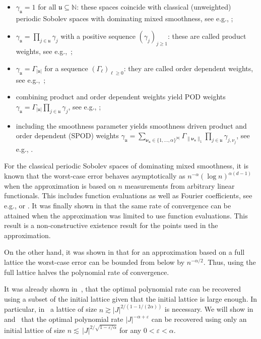 \documentclass[a4paper]{amsart}
\begin{document}
\begin{itemize}
\item
    $\gamma_{\mathfrak u} = 1$ for all $\mathfrak u\subseteq\mathds N$: these spaces coincide with classical (unweighted) periodic Sobolev spaces with dominating mixed smoothness, see e.g., \cite{DTU18};
\item
    $\gamma_{\mathfrak u} = \prod_{j\in\mathfrak u}\gamma_j$ with a positive sequence $(\gamma_j)_{j\ge 1}$: these are called product weights, see e.g.,~\cite{Sloan1998, Woniakowski2009};
\item
    $\gamma_{\mathfrak u} = \Gamma_{|\mathfrak u|}$ for a sequence $(\Gamma_\ell)_{\ell\ge 0}$: they are called order dependent weights, see e.g.,~\cite{Dick2006};
\item
    combining product and order dependent weights yield POD weights $\gamma_{\mathfrak u} = \Gamma_{|\mathfrak u|}\prod_{j\in\mathfrak u}\gamma_j$, see e.g., \cite{Kuo2012, Graham2014, Kuo2016, Graham2018};
\item
    including the smoothness parameter yields smoothness driven product and order dependent (SPOD) weights  $\gamma_{\mathfrak u} = \sum_{\bm\nu_{\mathfrak u}\in\{1, \dots, \alpha\}^{|\mathfrak u|}} \Gamma_{\|\bm\nu_{\mathfrak u}\|_1}\prod_{j\in\mathfrak u}\gamma_{j,\nu_j}$, see e.g., \cite{DKLNS14,Dick2016,Kaarnioja2020}.
\end{itemize}

For the classical periodic Sobolev spaces of dominating mixed smoothness, it is known that the worst-case error behaves asymptotically as $n^{-\alpha}(\log n)^{\alpha(d-1)}$ when the approximation is based on $n$ measurements from arbitrary linear functionals.
This includes function evaluations as well as Fourier coefficients, see e.g., \cite{M62} or \cite[Section~4.1]{DTU18}.
It was finally shown in \cite{DKU23} that the same rate of convergence can be attained when the approximation was limited to use function evaluations.
This result is a non-constructive existence result for the points used in the approximation.

On the other hand, it was shown in \cite[Proposition~3.3]{BKUV17} that for an approximation based on a full lattice the worst-case error can be bounded from below by $n^{-\alpha/2}$.
Thus, using the full lattice halves the polynomial rate of convergence.

It was already shown in~\cite{BKPU22}, that the optimal polynomial rate can be recovered using a subset of the initial lattice given that the initial lattice is large enough.
In particular, in~\cite{BKPU22} a lattice of size $n \gtrsim |J|^{2/(1-1/(2\alpha))}$ is necessary.
We will show in~ and~ that the optimal polynomial rate $|J|^{-\alpha+\varepsilon}$ can be recovered using only an initial lattice of size $n \lesssim\, |J|^{2/\sqrt{1-\varepsilon/\alpha}}$ for any $0<\varepsilon<\alpha$.
\end{document}
